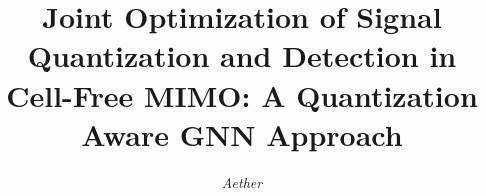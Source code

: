 \documentclass[journal]{IEEEtran}
\begin{document}
\title{Joint Optimization of Signal Quantization and Detection in Cell-Free MIMO: A Quantization Aware GNN Approach}

\author{\textit{Aether}}

\maketitle

\begin{abstract}

\end{abstract}



















\end{document}
